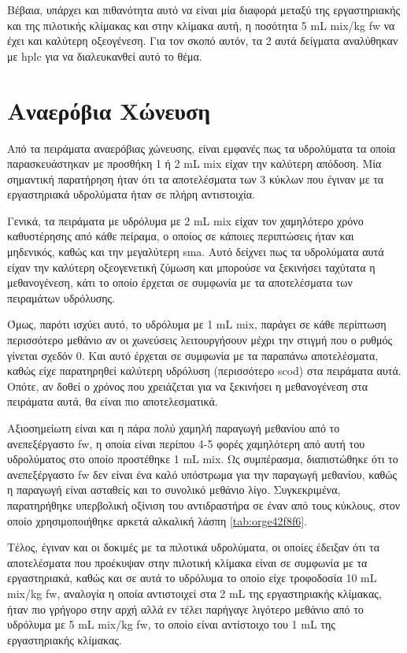 \documentclass[11pt]{report}
\begin{document}
Βέβαια, υπάρχει και πιθανότητα αυτό να είναι μία διαφορά μεταξύ της εργαστηριακής και της πιλοτικής κλίμακας και στην κλίμακα αυτή, η ποσότητα 5 mL \acrshort{mix}/kg \acrshort{fw} να έχει και καλύτερη οξεογένεση. Για τον σκοπό αυτόν, τα 2 αυτά δείγματα αναλύθηκαν με \acrshort{hplc} για να διαλευκανθεί αυτό το θέμα.

\section{Αναερόβια Χώνευση}
\label{sec:org448310e}
Από τα πειράματα αναερόβιας χώνευσης, είναι εμφανές πως τα υδρολύματα τα οποία παρασκευάστηκαν με προσθήκη 1 ή 2 mL \acrshort{mix} είχαν την καλύτερη απόδοση. Μία σημαντική παρατήρηση ήταν ότι τα αποτελέσματα των 3 κύκλων που έγιναν με τα εργαστηριακά υδρολύματα ήταν σε πλήρη αντιστοιχία.

Γενικά, τα πειράματα με υδρόλυμα με 2 mL \acrshort{mix} είχαν τον χαμηλότερο χρόνο καθυστέρησης από κάθε πείραμα, ο οποίος σε κάποιες περιπτώσεις ήταν και μηδενικός, καθώς και την μεγαλύτερη \acrshort{sma}. Αυτό δείχνει πως τα υδρολύματα αυτά είχαν την καλύτερη οξεογενετική ζύμωση και μπορούσε να ξεκινήσει ταχύτατα η μεθανογένεση, κάτι το οποίο έρχεται σε συμφωνία με τα αποτελέσματα των πειραμάτων υδρόλυσης.

Όμως, παρότι ισχύει αυτό, το υδρόλυμα με 1 mL \acrshort{mix}, παράγει σε κάθε περίπτωση περισσότερο μεθάνιο αν οι χωνεύσεις λειτουργήσουν μέχρι την στιγμή που ο ρυθμός γίνεται σχεδόν 0. Και αυτό έρχεται σε συμφωνία με τα παραπάνω αποτελέσματα, καθώς είχε παρατηρηθεί καλύτερη υδρόλυση (περισσότερο \acrshort{scod}) στα πειράματα αυτά. Οπότε, αν δοθεί ο χρόνος που χρειάζεται για να ξεκινήσει η μεθανογένεση στα πειράματα αυτά, θα είναι πιο αποτελεσματικά.

Αξιοσημείωτη είναι και η πάρα πολύ χαμηλή παραγωγή μεθανίου από το ανεπεξέργαστο \acrshort{fw}, η οποία είναι περίπου 4-5 φορές χαμηλότερη από αυτή του υδρολύματος στο οποίο προστέθηκε 1 mL \acrshort{mix}. Ως συμπέρασμα, διαπιστώθηκε ότι το ανεπεξέργαστο \acrshort{fw} δεν είναι ένα καλό υπόστρωμα για την παραγωγή μεθανίου, καθώς η παραγωγή είναι ασταθείς και το συνολικό μεθάνιο λίγο. Συγκεκριμένα, παρατηρήθηκε υπερβολική οξίνιση του αντιδραστήρα σε έναν από τους κύκλους, στον οποίο χρησιμοποιήθηκε αρκετά αλκαλική λάσπη \ref{tab:orge42f8f6}.

Τέλος, έγιναν και οι δοκιμές με τα πιλοτικά υδρολύματα, οι οποίες έδειξαν ότι τα αποτελέσματα που προέκυψαν στην πιλοτική κλίμακα είναι σε συμφωνία με τα εργαστηριακά, καθώς και σε αυτά το υδρόλυμα το οποίο είχε τροφοδοσία 10 mL \acrshort{mix}/kg \acrshort{fw}, αναλογία η οποία αντιστοιχεί στα 2 mL της εργαστηριακής κλίμακας, ήταν πιο γρήγορο στην αρχή αλλά εν τέλει παρήγαγε λιγότερο μεθάνιο από το υδρόλυμα με 5 mL \acrshort{mix}/kg \acrshort{fw}, το οποίο είναι αντίστοιχο του 1 mL της εργαστηριακής κλίμακας.
\end{document}
